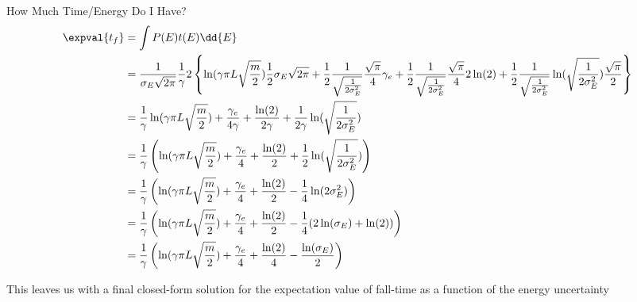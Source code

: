 \begin{answer}
\begin{answerpart}{How Much Time/Energy Do I Have?}
    \begin{equation}
      \begin{alignedat}{2}
        &&\expval{t_f}
        &= \int P(E)t(E) \dd{E}\\
        &&&=
        \frac{1}{\sigma_E\sqrt{2\pi}}
        \frac{1}{\gamma}
        2
        \left\{
        \ln(\gamma \pi L \sqrt{\frac{m}{2}})
        \frac{1}{2}\sigma_E\sqrt{2\pi}
        +
        \frac{1}{2}
        \frac{1}{\sqrt{\frac{1}{2\sigma_E^2}}}
        \frac{\sqrt{\pi}}{4}
        \gamma_e
        +
        \frac{1}{2}
        \frac{1}{\sqrt{\frac{1}{2\sigma_E^2}}}
        \frac{\sqrt{\pi}}{4}
        2\ln(2)
        +
        \frac{1}{2}
        \frac{1}{\sqrt{\frac{1}{2\sigma_E^2}}}
        \ln(\sqrt{\frac{1}{2\sigma_E^2}})
        \frac{\sqrt{\pi}}{2}
        \right\}
        \\
        &&&=
        \frac{1}{\gamma}
        \ln(\gamma \pi L \sqrt{\frac{m}{2}})
        +
        \frac{\gamma_e}{4\gamma}
        +
        \frac{\ln(2)}{2\gamma}
        +
        \frac{1}{2\gamma}
        \ln(\sqrt{\frac{1}{2\sigma_E^2}})
        \\
        &&&=
        \frac{1}{\gamma}
        \left(
        \ln(\gamma \pi L \sqrt{\frac{m}{2}})
        +
        \frac{\gamma_e}{4}
        +
        \frac{\ln(2)}{2}
        +
        \frac{1}{2}
        \ln(\sqrt{\frac{1}{2\sigma_E^2}})
        \right)
        \\
        &&&=
        \frac{1}{\gamma}
        \left(
        \ln(\gamma \pi L \sqrt{\frac{m}{2}})
        +
        \frac{\gamma_e}{4}
        +
        \frac{\ln(2)}{2}
        -
        \frac{1}{4}
        \ln(2\sigma_E^2)
        \right)
        \\
        &&&=
        \frac{1}{\gamma}
        \left(
        \ln(\gamma \pi L \sqrt{\frac{m}{2}})
        +
        \frac{\gamma_e}{4}
        +
        \frac{\ln(2)}{2}
        -
        \frac{1}{4}
        (2\ln(\sigma_E) + \ln(2))
        \right)
        \\
        &&&=
        \frac{1}{\gamma}
        \left(
        \ln(\gamma \pi L \sqrt{\frac{m}{2}})
        +
        \frac{\gamma_e}{4}
        +
        \frac{\ln(2)}{4}
        -
        \frac{\ln(\sigma_E)}{2}
        \right)
        \\
      \end{alignedat}
    \end{equation}

    This leaves us with a final closed-form solution for the
    expectation value of fall-time as a function of the energy
    uncertainty


\end{answerpart}
\end{answer}
